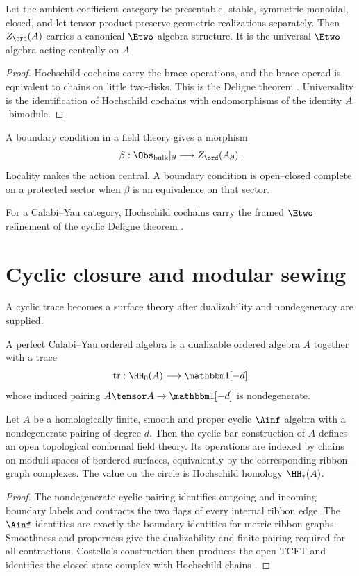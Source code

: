 \begin{theorem}
Let the ambient coefficient category be presentable, stable, symmetric monoidal, closed, and let tensor product preserve geometric realizations separately. Then $Z_{\ord}(A)$ carries a canonical $\Etwo$-algebra structure. It is the universal $\Etwo$ algebra acting centrally on $A$.
\end{theorem}
\begin{proof}
Hochschild cochains carry the brace operations, and the brace operad is equivalent to chains on little two-disks. This is the Deligne theorem \cite{McClureSmith,KontsevichSoibelmanDeligne}. Universality is the identification of Hochschild cochains with endomorphisms of the identity $A$-bimodule.
\end{proof}

A boundary condition in a field theory gives a morphism
\[
 \beta:\Obs_{\mathrm{bulk}}|_{\partial}\longrightarrow Z_{\ord}(A_{\partial}).
\]
Locality makes the action central. A boundary condition is open--closed complete on a protected sector when $\beta$ is an equivalence on that sector.

For a Calabi--Yau category, Hochschild cochains carry the framed $\Etwo$ refinement of the cyclic Deligne theorem \cite{BravRozenblyum}.

\chapter{Cyclic closure and modular sewing}
A cyclic trace becomes a surface theory after dualizability and nondegeneracy are supplied.

\begin{definition}
A perfect Calabi--Yau ordered algebra is a dualizable ordered algebra $A$ together with a trace
\[
 \operatorname{tr}:\HH_0(A)\longrightarrow\mathbbm1[-d]
\]
whose induced pairing $A\tensor A\to\mathbbm1[-d]$ is nondegenerate.
\end{definition}

\begin{theorem}
Let $A$ be a homologically finite, smooth and proper cyclic $\Ainf$ algebra with a nondegenerate pairing of degree $d$.  Then the cyclic bar construction of $A$ defines an open topological conformal field theory.  Its operations are indexed by chains on moduli spaces of bordered surfaces, equivalently by the corresponding ribbon-graph complexes.  The value on the circle is Hochschild homology $\HH_*(A)$.
\end{theorem}
\begin{proof}
The nondegenerate cyclic pairing identifies outgoing and incoming boundary labels and contracts the two flags of every internal ribbon edge.  The $\Ainf$ identities are exactly the boundary identities for metric ribbon graphs.  Smoothness and properness give the dualizability and finite pairing required for all contractions.  Costello's construction then produces the open TCFT and identifies the closed state complex with Hochschild chains \cite{CostelloCY}.
\end{proof}

